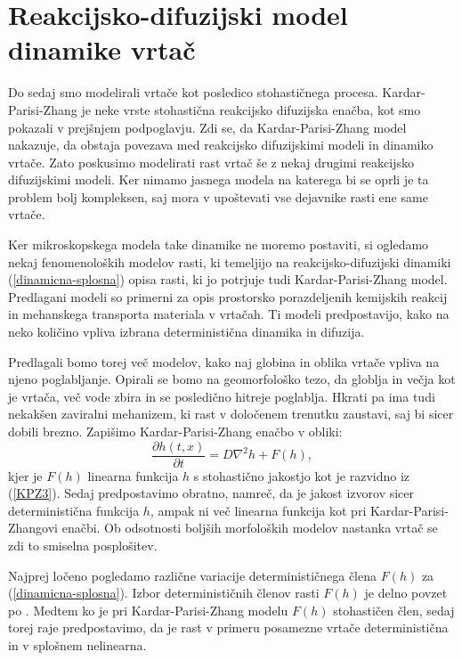 \documentclass[a4paper, twoside, 12pt]{book}
\begin{document}
\newpage
\section{Reakcijsko-difuzijski model dinamike vrtač}

Do sedaj smo modelirali vrtače kot posledico stohastičnega procesa. Kardar-Parisi-Zhang je neke vrste stohastična reakcijsko difuzijska enačba, kot smo pokazali v prejšnjem podpoglavju. Zdi se, da Kardar-Parisi-Zhang model nakazuje, da obstaja povezava med reakcijsko difuzijskimi modeli in dinamiko vrtače. Zato poskusimo modelirati rast vrtač še z nekaj drugimi reakcijsko difuzijskimi modeli. Ker nimamo jasnega modela na katerega bi se oprli je ta problem bolj kompleksen, saj mora v upoštevati vse dejavnike rasti ene same vrtače. 

Ker mikroskopskega modela take dinamike ne moremo postaviti, si ogledamo nekaj fenomenoloških modelov rasti, ki temeljijo na reakcijsko-difuzijski dinamiki (\ref{dinamicna-splosna}) opisa rasti, ki jo potrjuje tudi Kardar-Parisi-Zhang model. Predlagani modeli so primerni za opis prostorsko porazdeljenih kemijskih reakcij in mehanskega transporta materiala v vrtačah. Ti modeli predpostavijo, kako na neko količino vpliva izbrana deterministična dinamika in difuzija.

Predlagali bomo torej več modelov, kako naj globina in oblika vrtače vpliva na njeno poglabljanje. Opirali se bomo na geomorfološko tezo, da globlja in večja kot je vrtača, več vode zbira in se posledično hitreje poglablja. Hkrati pa ima tudi nekakšen zaviralni mehanizem, ki rast v določenem trenutku zaustavi, saj bi sicer dobili brezno.
Zapišimo Kardar-Parisi-Zhang enačbo v obliki:
\begin{equation}
  \frac{ \partial h(t,x) }{ \partial t} = D \nabla^2 h + F(h),
  \label{dinamicna-splosna}
\end{equation}
kjer je $F(h)$ linearna funkcija $h$ s stohastično jakostjo kot je razvidno iz (\ref{KPZ3}). Sedaj predpostavimo obratno, namreč, da je jakost izvorov sicer deterministična funkcija $h$, ampak ni več linearna funkcija kot pri Kardar-Parisi-Zhangovi enačbi. Ob odsotnosti boljših morfoloških modelov nastanka vrtač se zdi to smiselna posplošitev.

Najprej ločeno pogledamo različne variacije determinističnega člena $F(h)$ za (\ref{dinamicna-splosna}). Izbor determinističnih členov rasti $F(h)$ je delno povzet po \cite{kandler2010population}. Medtem ko je pri Kardar-Parisi-Zhang modelu $F(h)$ stohastičen člen, sedaj torej raje predpostavimo, da je rast v primeru posamezne vrtače deterministična in v splošnem nelinearna.
\end{document}
